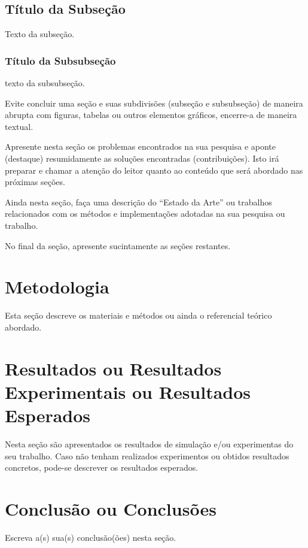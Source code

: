 \documentclass[journal]{IEEEtran}
\begin{document}
\subsection{Título da Subseção}
Texto da subseção.

\subsubsection{Título da Subsubseção}
texto da subsubseção.

Evite concluir uma seção e suas subdivisões (subseção e subsubseção) de maneira abrupta com figuras, tabelas ou outros elementos gráficos, encerre-a de maneira textual. 

Apresente nesta seção os problemas encontrados na sua pesquisa e aponte (destaque) resumidamente as soluções encontradas (contribuições). Isto irá preparar e chamar a atenção do leitor quanto ao conteúdo que será abordado nas próximas seções.

Ainda nesta seção, faça uma descrição do ``Estado da Arte'' ou trabalhos relacionados com os métodos e implementações adotadas na sua pesquisa ou trabalho.

No final da seção, apresente sucintamente as seções restantes.





\section{Metodologia}
Esta seção descreve os materiais e métodos ou ainda o referencial teórico abordado.


\section{Resultados ou Resultados Experimentais ou Resultados Esperados}
Nesta seção são apresentados os resultados de simulação e/ou experimentas do seu trabalho. Caso não tenham realizados experimentos ou obtidos resultados concretos, pode-se descrever os resultados esperados.


\section{Conclusão ou Conclusões}
Escreva a(s) sua(s) conclusão(ões) nesta seção.
\end{document}
